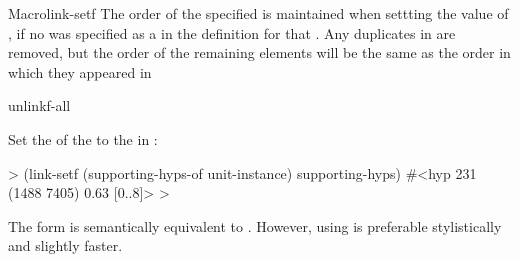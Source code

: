 \documentclass[10pt,twoside,english,pdftex]{article}
\begin{document}
\begin{functiondoc}{Macro}{link-setf}
The order of the specified  is
maintained when settting the value of , if
no  was specified as a
 in the  definition for that
.  Any duplicates in
 are removed, but the order of the
remaining elements will be the same as the order in which they appeared in

\begin{alsos}{unlinkf-all}
\also[linkf]
\also[unlinkf]
\end{alsos}

\fnexample Set the   of the
  to the  in
:
%
\W\supp
\begin{example}
  > (link-setf (supporting-hyps-of unit-instance) supporting-hyps)
  #<hyp 231 (1488 7405) 0.63 [0..8]>
  >
\end{example}

\fnnote {}%
The form 
is semantically equivalent to .  However, using
 is preferable stylistically and
slightly faster. 

\end{functiondoc}

\end{document}
